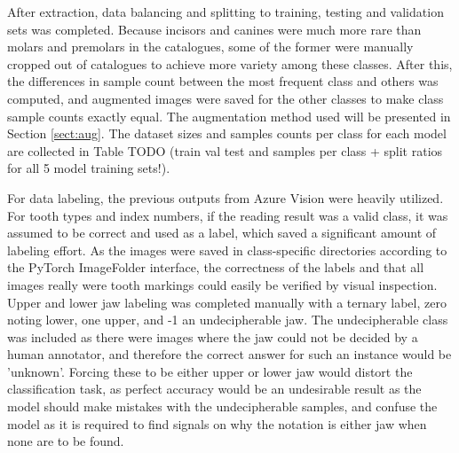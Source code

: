 \documentclass{article}
\begin{document}
After extraction, data balancing and splitting to training, testing and validation sets 
was completed.
Because incisors and canines were much more rare 
than molars and premolars in the catalogues, some of the former were manually cropped out 
of catalogues to achieve more variety among these classes. After this, the differences 
in sample count between the most frequent class and others was computed, and augmented 
images were saved for the other classes to make class sample counts exactly equal. The augmentation 
method used will be presented in Section \ref{sect:aug}. The dataset sizes and samples counts per class 
for each model are collected in Table TODO (train val test and samples per class + split ratios for all 5 model training sets!).

For data labeling, the previous outputs from Azure Vision were heavily utilized. For 
tooth types and index numbers, if the reading result was a valid class, it was assumed to 
be correct and used as a label, which saved a significant amount of labeling effort. As the 
images were saved in class-specific directories according to the PyTorch ImageFolder interface,
the correctness of the labels and that all images really were tooth markings could easily be verified by visual inspection. Upper and lower jaw labeling 
was completed manually with a ternary label, zero noting lower, one upper, and -1 an undecipherable jaw.
The undecipherable class was included as there were images where the jaw could not be decided by a human annotator, 
and therefore the correct answer for such an instance would be 'unknown'. Forcing these to be either upper or lower jaw 
would distort the classification task, as perfect accuracy would be an undesirable result as the model should 
make mistakes with the undecipherable samples, and confuse the model as it is required to find signals on why 
the notation is either jaw when none are to be found.
\end{document}
